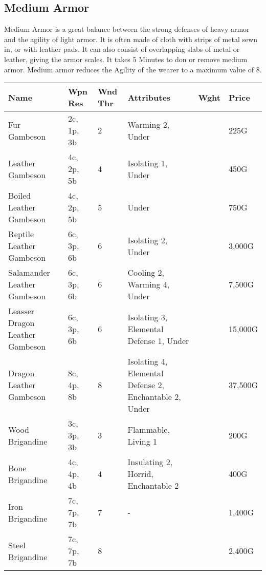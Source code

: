 \subsection{Medium Armor}

Medium Armor is a great balance between the strong defenses of heavy armor and the agility of light armor. It is often made of cloth with strips of metal sewn in, or with leather pads. It can also consist of overlapping slabs of metal or leather, giving the armor scales. It takes 5 Minutes to don or remove medium armor. Medium armor reduces the Agility of the wearer to a maximum value of 8.

\begin{longtable}{p{3.5cm} | p{1.5cm} | p{0.75cm} | p{4cm} | p{1cm} | p{1.25cm}}
	Name & Wpn Res & Wnd Thr &  Attributes & Wght & Price\\ \hline
	
	Fur Gambeson & 2c, 1p, 3b & 2 & Warming 2, Under &  & 225G\\
	
	Leather Gambeson & 4c, 2p, 5b & 4 & Isolating 1, Under &  & 450G\\
	
	Boiled Leather Gambeson & 4c, 2p, 5b & 5 & Under &  & 750G\\
	
	Reptile Leather Gambeson & 6c, 3p, 6b & 6 & Isolating 2, Under &  & 3,000G\\
	
	Salamander Leather Gambeson & 6c, 3p, 6b & 6 & Cooling 2, Warming 4, Under &  & 7,500G\\
	
	Leasser Dragon Leather Gambeson & 6c, 3p, 6b & 6 & Isolating 3, Elemental Defense 1, Under &  & 15,000G\\
	
	Dragon Leather Gambeson & 8c, 4p, 8b & 8 & Isolating 4, Elemental Defense 2, Enchantable 2, Under &  & 37,500G\\
	
	Wood Brigandine & 3c, 3p, 3b & 3 & Flammable, Living 1 &  & 200G\\
	
	Bone Brigandine & 4c, 4p, 4b & 4 & Insulating 2, Horrid, Enchantable 2 &  & 400G\\
	
	Iron Brigandine & 7c, 7p, 7b & 7 & - &  & 1,400G\\
	
	Steel Brigandine & 7c, 7p, 7b & 8 &  &  & 2,400G\\
	

\end{longtable}
